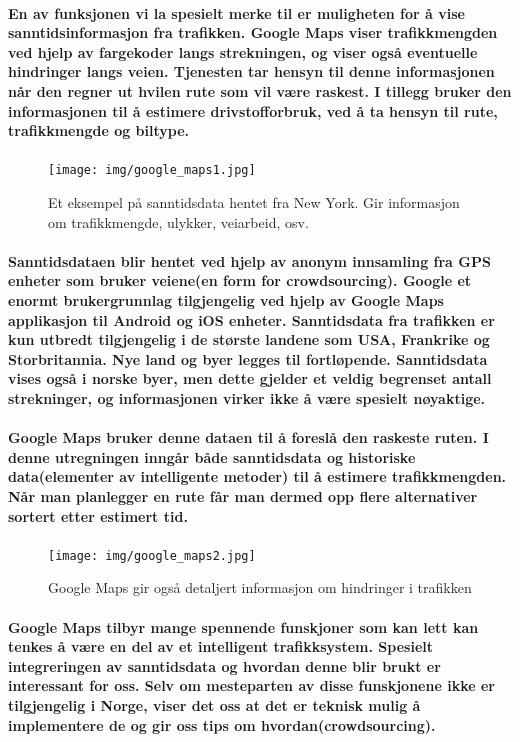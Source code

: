 \paragraph{En av funksjonen vi la spesielt merke til er muligheten for å vise sanntidsinformasjon fra trafikken. Google Maps viser trafikkmengden ved hjelp av fargekoder langs strekningen, og viser også eventuelle hindringer langs veien. Tjenesten tar hensyn til denne informasjonen når den regner ut hvilen rute som vil være raskest. I tillegg bruker den informasjonen til å estimere drivstofforbruk, ved å ta hensyn til rute, trafikkmengde og biltype.}

\begin{figure}[p]
\centering
\texttt{[image: img/google\_maps1.jpg]}
\caption{Et eksempel på sanntidsdata hentet fra New York. Gir informasjon om trafikkmengde, ulykker, veiarbeid, osv.}
\label{fig:google_maps1}
\end{figure}

\paragraph{Sanntidsdataen blir hentet ved hjelp av anonym innsamling fra GPS enheter som bruker veiene(en form for crowdsourcing). Google et enormt brukergrunnlag tilgjengelig ved hjelp av Google Maps applikasjon til Android og iOS enheter. Sanntidsdata fra trafikken er kun utbredt tilgjengelig i de største landene som USA, Frankrike og Storbritannia. Nye land og byer legges til fortløpende. Sanntidsdata vises også i norske byer, men dette gjelder et veldig begrenset antall strekninger, og informasjonen virker ikke å være spesielt nøyaktige.}

\paragraph{Google Maps bruker denne dataen til å foreslå den raskeste ruten. I denne utregningen inngår både sanntidsdata og historiske data(elementer av intelligente metoder) til å estimere trafikkmengden. Når man planlegger en rute får man dermed opp flere alternativer sortert etter estimert tid.}

\begin{figure}[p]
\centering
\texttt{[image: img/google\_maps2.jpg]}
\caption{Google Maps gir også detaljert informasjon om hindringer i trafikken}
\label{fig:google_maps2}
\end{figure}

\paragraph{Google Maps tilbyr mange spennende funskjoner som kan lett kan tenkes å være en del av et intelligent trafikksystem. Spesielt integreringen av sanntidsdata og hvordan denne blir brukt er interessant for oss. Selv om mesteparten av disse funskjonene ikke er tilgjengelig i Norge, viser det oss at det er teknisk mulig å implementere de og gir oss tips om hvordan(crowdsourcing).}


